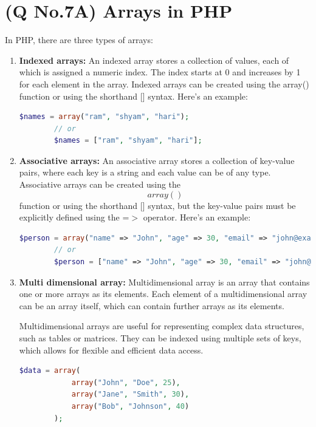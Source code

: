 \documentclass[11pt]{article}
\begin{document}
\section{(Q No.7A) Arrays in PHP}
In PHP, there are three types of arrays:
\begin{enumerate}
    \item \textbf{Indexed arrays:}
    An indexed array stores a collection of values, each of which is assigned a numeric index. The index starts at 0 and increases by 1 for each element in the array. Indexed arrays can be created using the array() function or using the shorthand [] syntax. Here's an example:
    \begin{lstlisting}[language=php]
        $names = array("ram", "shyam", "hari");
        // or
        $names = ["ram", "shyam", "hari"];
    \end{lstlisting}

    \item \textbf{Associative arrays:}
    An associative array stores a collection of key-value pairs, where each key is a string and each value can be of any type. Associative arrays can be created using the \[array()\] function or using the shorthand [] syntax, but the key-value pairs must be explicitly defined using the =$>$ operator. Here's an example:
    \begin{lstlisting}[language=php]
        $person = array("name" => "John", "age" => 30, "email" => "john@example.com");
        // or
        $person = ["name" => "John", "age" => 30, "email" => "john@example.com"];

    \end{lstlisting}

    \item \textbf{Multi dimensional array:}
    Multidimensional array is an array that contains one or more arrays as its elements. Each element of a multidimensional array can be an array itself, which can contain further arrays as its elements.

    Multidimensional arrays are useful for representing complex data structures, such as tables or matrices. They can be indexed using multiple sets of keys, which allows for flexible and efficient data access.
    \begin{lstlisting}[language=php]
        $data = array(
            array("John", "Doe", 25),
            array("Jane", "Smith", 30),
            array("Bob", "Johnson", 40)
        );
    \end{lstlisting}
\end{enumerate}
\end{document}
